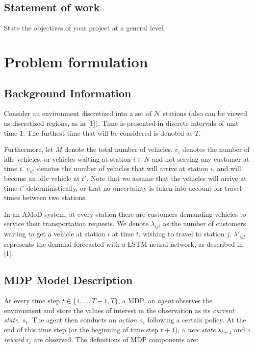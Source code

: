 \documentclass[letterpaper, 10 pt, conference]{ieeeconf}  %
\begin{document}
\subsection{Statement of work} 
State the objectives of your project at a general level.




\section{Problem formulation}
\subsection{Background Information}
Consider an environment discretized into a set of $\mathcal{N}$ stations (also can be viewed as discretized regions, as in [1]). Time is presented in discrete intervals of unit time $1$. The furthest time that will be considered is denoted as $T$.

Furthermore, let $M$ denote the total number of vehicles. $v_i$ denotes the number of idle vehicles, or vehicles waiting at station $i\in N$ and not serving any customer at time $t$. $v_{it'}$ denotes the number of vehicles that will arrive at station $i$, and will become an idle vehicle at $t'$. Note that we assume that the vehicles will arrive at time $t'$ deterministically, or that no uncertainty is taken into account for travel times between two stations. 

In an AMoD system, at every station there are customers demanding vehicles to service their transportation requests. We denote $\lambda_{ijt}$ as the number of customers waiting to get a vehicle at station $i$ at time $t$, wishing to travel to station $j$. $\lambda'_{ijt}$ represents the demand forecasted with a LSTM neural network, as described in [1].
\subsection{MDP Model Description}
At every time step $t \in \{1,...,T-1,T\}$, a MDP, an \textit{agent} observes the environment and store the values of interest in the observation as its \textit{current state, $s_t$}. The agent then conducts an \textit{action $a_t$} following a certain policy. At the end of this time step (or the beginning of time step $t+1$), a \textit{new state $s_{t+1}$} and a \textit{reward $r_t$} are observed. The definitions of MDP components are:\\
\end{document}

